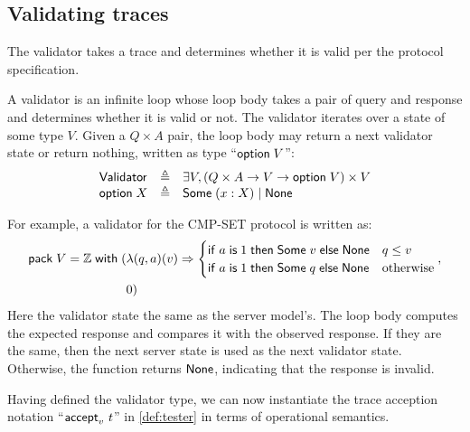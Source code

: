 \subsection{Validating traces}
The validator takes a trace and determines whether it is valid per the protocol
specification.

\begin{definition}[Validator]
A validator is an infinite loop whose loop body takes a pair of query and
response and determines whether it is valid or not.  The validator iterates over
a state of some type $V$.  Given a $Q\times A$ pair, the loop body may return a
next validator state or return nothing, written as type ``$\mathsf{option}\; V$'':
\[\begin{array}{lll}
  \mathsf{Validator}&\triangleq&\exists V,(Q\times A\to V\to\mathsf{option}\; V)\times V\\
  \mathsf{option}\; X&\triangleq&\mathsf{Some}\;(x:X)\mid\mathsf{None}
\end{array}\]
\end{definition}

For example, a validator for the CMP-SET protocol is written as:
\begin{align*}
  \mathsf{pack}\;V=\mathbb Z\;\mathsf{with}\;(&\lambda(q,a)(v)\Rightarrow
      \begin{cases}
        \mathsf{if}\; a\;\mathsf{is}\; 1\;\mathsf{then}\;\mathsf{Some}\;v\;\mathsf{else}\;\mathsf{None}&q\le v\\
        \mathsf{if}\; a\;\mathsf{is}\; 1\;\mathsf{then}\;\mathsf{Some}\;q\;\mathsf{else}\;\mathsf{None}&\mathrm{otherwise}
      \end{cases}
   ,\\
    &0)
\end{align*}
Here the validator state the same as the server model's.  The loop body computes
the expected response and compares it with the observed response.  If they are
the same, then the next server state is used as the next validator state.
Otherwise, the function returns $\mathsf{None}$, indicating that the response is
invalid.

Having defined the validator type, we can now instantiate the trace acception
notation ``$\mathsf{accept}_{v}~{t}$'' in \autoref{def:tester} in terms of operational
semantics.

